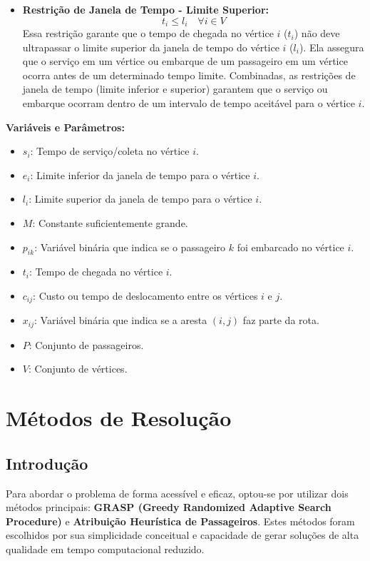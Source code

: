 \documentclass[12pt, a4paper]{report}
\begin{document}
\begin{itemize}
    \item \textbf{Restrição de Janela de Tempo - Limite Superior:}
     \begin{equation}
        t_i \leq l_i \quad \forall i \in V
    \end{equation}
    Essa restrição garante que o tempo de chegada no vértice $i$ ($t_i$) não deve ultrapassar o limite superior da janela de tempo do vértice $i$ ($l_i$). Ela assegura que o serviço em um vértice ou embarque de um passageiro em um vértice ocorra antes de um determinado tempo limite. Combinadas, as restrições de janela de tempo (limite inferior e superior) garantem que o serviço ou embarque ocorram dentro de um intervalo de tempo aceitável para o vértice $i$.
\end{itemize}

\textbf{Variáveis e Parâmetros:}

\begin{itemize}
    \item  $s_i$: Tempo de serviço/coleta no vértice $i$.
    \item $e_i$: Limite inferior da janela de tempo para o vértice $i$.
    \item  $l_i$: Limite superior da janela de tempo para o vértice $i$.
    \item  $M$: Constante suficientemente grande.
     \item $p_{ik}$: Variável binária que indica se o passageiro $k$ foi embarcado no vértice $i$.
    \item $t_i$: Tempo de chegada no vértice $i$.
      \item $c_{ij}$: Custo ou tempo de deslocamento entre os vértices $i$ e $j$.
    \item $x_{ij}$: Variável binária que indica se a aresta $(i, j)$ faz parte da rota.
      \item $P$: Conjunto de passageiros.
    \item $V$: Conjunto de vértices.
\end{itemize}

\chapter{Métodos de Resolução}

\section{Introdução}
Para abordar o problema de forma acessível e eficaz, optou-se por utilizar dois métodos principais: \textbf{GRASP (Greedy Randomized Adaptive Search Procedure)} e \textbf{Atribuição Heurística de Passageiros}. Estes métodos foram escolhidos por sua simplicidade conceitual e capacidade de gerar soluções de alta qualidade em tempo computacional reduzido.
\end{document}
